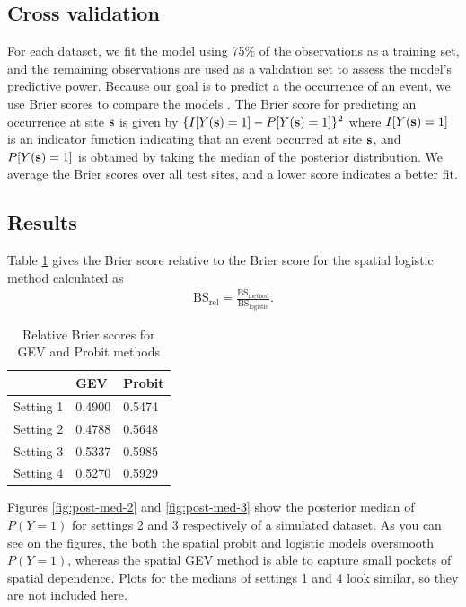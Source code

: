 \documentclass[11pt]{article}
\begin{document}
\subsection{Cross validation}\label{s:modelselect}
For each dataset, we fit the model using 75\% of the observations as a training set, and the remaining observations are used as a validation set to assess the model's predictive power.
Because our goal is to predict a the occurrence of an event, we use Brier scores to compare the models \citep{Gneiting2007}.
The Brier score for predicting an occurrence at site $\mbox{\bf s}$ is given by $\{I[Y(\mbox{\bf s})=1] - P[Y(\mbox{\bf s})=1]\}^2$ where $I[Y(\mbox{\bf s}) = 1]$ is an indicator function indicating that an event occurred at site $\mbox{\bf s}$, and $P[Y(\mbox{\bf s}) = 1]$ is obtained by taking the median of the posterior distribution.
We average the Brier scores over all test sites, and a lower score indicates a better fit.

\subsection{Results}
Table \ref{tbl:simresults} gives the Brier score relative to the Brier score for the spatial logistic method calculated as
\begin{align}
  \text{BS}_{\text{rel}} = \frac{\text{BS}_{\text{method}}}{\text{BS}_{\text{logistic}}}.
\end{align}

\begin{table}
  \caption{Relative Brier scores for GEV and Probit methods}
  \label{tbl:simresults}
  \centering
  \begin{tabular}{r|ll}
    \cline{2-3}
              & GEV    & Probit\\
    \hline
    Setting 1 & 0.4900 & 0.5474\\
    Setting 2 & 0.4788 & 0.5648\\
    Setting 3 & 0.5337 & 0.5985\\
    Setting 4 & 0.5270 & 0.5929\\
    \hline
  \end{tabular}
\end{table}

Figures \ref{fig:post-med-2} and \ref{fig:post-med-3} show the posterior median of $P(Y =1)$ for settings 2 and 3 respectively of a simulated dataset.
As you can see on the figures, the both the spatial probit and logistic models oversmooth $P(Y = 1)$, whereas the spatial GEV method is able to capture small pockets of spatial dependence.
Plots for the medians of settings 1 and 4 look similar, so they are not included here.
\end{document}
